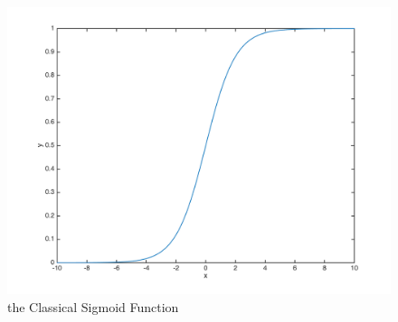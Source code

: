 \begin{figure}
\begin{center}
\includegraphics[scale=0.7]{sigmoid.png}
\caption{the Classical Sigmoid Function}
\end{center}
\end{figure}


